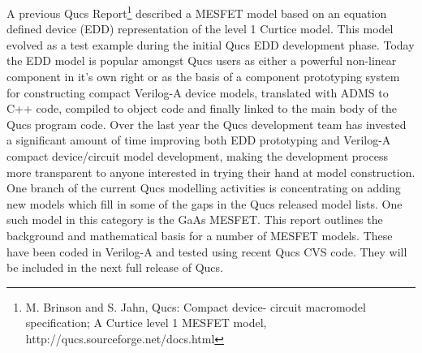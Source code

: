 %
%
%
%

\renewcommand{\thesubfigure}{\thefigure(\alph{subfigure})}
\makeatletter
  \renewcommand{\@thesubfigure}{\thesubfigure:\space}
  \renewcommand{\p@subfigure}{}
\makeatother

\renewcommand{\thesubtable}{\thetable(\alph{subtable})}
\makeatletter
  \renewcommand{\@thesubtable}{\thesubtable:\space}
  \renewcommand{\p@subtable}{}
\makeatother


A previous Qucs Report\footnote{M. Brinson and S. Jahn, Qucs: Compact
device- circuit macromodel specification; A Curtice level 1 MESFET
model, http://qucs.sourceforge.net/docs.html} described a MESFET model
based on an equation defined device (EDD) representation of the level
1 Curtice model. This model evolved as a test example during the
initial Qucs EDD development phase. Today the EDD model is popular
amongst Qucs users as either a powerful non-linear component in it's
own right or as the basis of a component prototyping system for
constructing compact Verilog-A device models, translated with ADMS to
C++ code, compiled to object code and finally linked to the main body
of the Qucs program code. Over the last year the Qucs development team
has invested a significant amount of time improving both EDD
prototyping and Verilog-A compact device/circuit model development,
making the development process more transparent to anyone interested
in trying their hand at model construction. One branch of the current
Qucs modelling activities is concentrating on adding new models which
fill in some of the gaps in the Qucs released model lists. One such
model in this category is the GaAs MESFET. This report outlines the
background and mathematical basis for a number of MESFET models. These
have been coded in Verilog-A and tested using recent Qucs CVS
code. They will be included in the next full release of Qucs.


